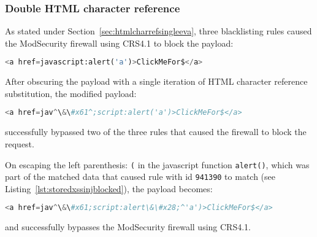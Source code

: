 \subsubsection{Double HTML character reference}
\label{sec:doublehtmlcharref}
As stated under Section~\ref{sec:htmlcharrefsingleeva}, three blacklisting rules caused the ModSecurity firewall using CRS4.1 to block the payload:

\begin{lstlisting}[style=basicStyle, language=Python]
<a href=javascript:alert('a')>ClickMeFor$</a>
\end{lstlisting}

After obscuring the payload with a single iteration of HTML character reference substitution, the modified payload:

\begin{lstlisting}[style=basicStyle, language=Python, escapeinside=\^\^]
<a href=jav^\&\#x61^;script:alert('a')>ClickMeFor$</a>
\end{lstlisting}

successfully bypassed two of the three rules that caused the firewall to block the request.

On escaping the left parenthesis: \verb|(| in the javascript function \verb|alert()|, which was part of the matched data that caused rule with id \verb|941390| to match (see Listing~\ref{lst:storedxssinjblocked}), the payload becomes:

\begin{lstlisting}[style=basicStyle, language=Python, caption=HTML character reference bypass, label={lst:htmlcharacterreferencebypass}, escapeinside=\^\^]
<a href=jav^\&\#x61;script:alert\&\#x28;^'a')>ClickMeFor$</a>
\end{lstlisting}

and successfully bypasses the ModSecurity firewall using CRS4.1.


